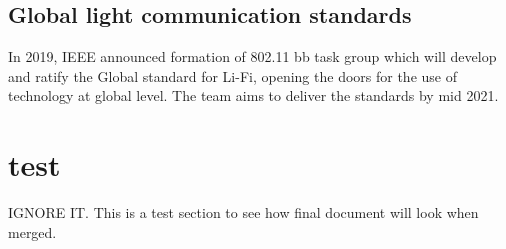 \documentclass{article}
\begin{document}
\subsection{Global light communication standards}

In 2019, IEEE announced formation of 802.11 bb task group which will develop
and ratify the Global standard for Li-Fi, opening the doors for the use of
technology at global level. 
The team aims to deliver the standards by mid 2021.


\printbibliography[heading=subbibliography]


\vspace{2in}
\section{test}
IGNORE IT. This is a test section to see how final document will look when merged. \\

\lipsum[1-1]
\printbibliography[heading=subbibliography]
\end{document}
